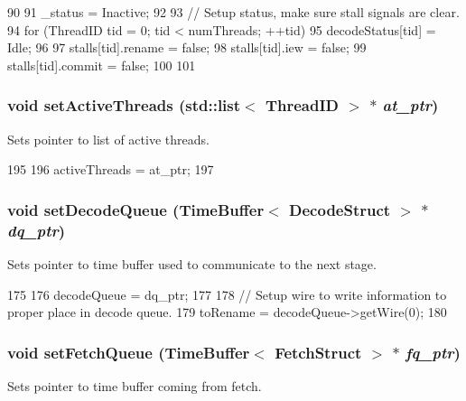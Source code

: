 \begin{DoxyCode}
90 {
91     _status = Inactive;
92 
93     // Setup status, make sure stall signals are clear.
94     for (ThreadID tid = 0; tid < numThreads; ++tid) {
95         decodeStatus[tid] = Idle;
96 
97         stalls[tid].rename = false;
98         stalls[tid].iew = false;
99         stalls[tid].commit = false;
100     }
101 }
\end{DoxyCode}
\hypertarget{classDefaultDecode_aab96bdacf8bd420402cbb543f994e054}{
\subsubsection[{setActiveThreads}]{\setlength{\rightskip}{0pt plus 5cm}void setActiveThreads ({\bf std::list}$<$ {\bf ThreadID} $>$ $\ast$ {\em at\_\-ptr})}}
\label{classDefaultDecode_aab96bdacf8bd420402cbb543f994e054}
Sets pointer to list of active threads. 


\begin{DoxyCode}
195 {
196     activeThreads = at_ptr;
197 }
\end{DoxyCode}
\hypertarget{classDefaultDecode_a21f95db13a2fc05d7a5fcc43fec1f1e7}{
\subsubsection[{setDecodeQueue}]{\setlength{\rightskip}{0pt plus 5cm}void setDecodeQueue ({\bf TimeBuffer}$<$ {\bf DecodeStruct} $>$ $\ast$ {\em dq\_\-ptr})}}
\label{classDefaultDecode_a21f95db13a2fc05d7a5fcc43fec1f1e7}
Sets pointer to time buffer used to communicate to the next stage. 


\begin{DoxyCode}
175 {
176     decodeQueue = dq_ptr;
177 
178     // Setup wire to write information to proper place in decode queue.
179     toRename = decodeQueue->getWire(0);
180 }
\end{DoxyCode}
\hypertarget{classDefaultDecode_ad1be90519aa7737ddf8e41de079a5ea9}{
\subsubsection[{setFetchQueue}]{\setlength{\rightskip}{0pt plus 5cm}void setFetchQueue ({\bf TimeBuffer}$<$ {\bf FetchStruct} $>$ $\ast$ {\em fq\_\-ptr})}}
\label{classDefaultDecode_ad1be90519aa7737ddf8e41de079a5ea9}
Sets pointer to time buffer coming from fetch. 


